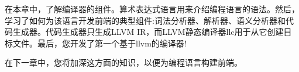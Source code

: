 在本章中，了解编译器的组件。算术表达式语言用来介绍编程语言的语法。然后，学习了如何为该语言开发前端的典型组件:词法分析器、解析器、语义分析器和代码生成器。代码生成器只生成LLVM IR，而LLVM静态编译器llc用于从它创建目标文件。最后，您开发了第一个基于llvm的编译器!\par

在下一章中，您将加深这方面的知识，以便为编程语言构建前端。\par

\newpage